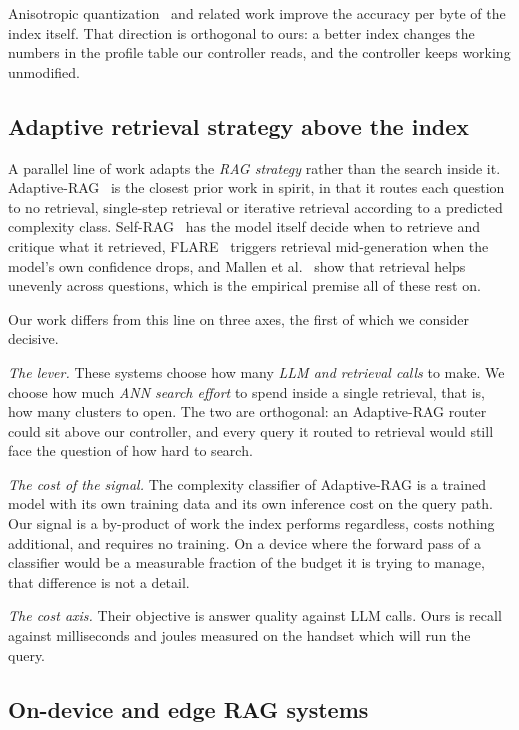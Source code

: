 \documentclass[journal]{IEEEtran}
\begin{document}
Anisotropic quantization~\cite{guo2020scann} and related work improve the
accuracy per byte of the index itself. That direction is orthogonal to
ours: a better index changes the numbers in the profile table our
controller reads, and the controller keeps working unmodified.

\subsection{Adaptive retrieval strategy above the index}
\label{sec:rel-adaptive-rag}

A parallel line of work adapts the \emph{RAG strategy} rather than the
search inside it. Adaptive-RAG~\cite{jeong2024adaptiverag} is the closest
prior work in spirit, in that it routes each question to no retrieval,
single-step retrieval or iterative retrieval according to a predicted
complexity class. Self-RAG~\cite{asai2024selfrag} has the model itself
decide when to retrieve and critique what it retrieved,
FLARE~\cite{jiang2023flare} triggers retrieval mid-generation when the
model's own confidence drops, and Mallen et al.~\cite{mallen2023whennot}
show that retrieval helps unevenly across questions, which is the empirical
premise all of these rest on.

Our work differs from this line on three axes, the first of which we
consider decisive.

\emph{The lever.} These systems choose how many \emph{LLM and retrieval
calls} to make. We choose how much \emph{ANN search effort} to spend inside
a single retrieval, that is, how many clusters to open. The two are
orthogonal: an Adaptive-RAG router could sit above our controller, and
every query it routed to retrieval would still face the question of how
hard to search.

\emph{The cost of the signal.} The complexity classifier of Adaptive-RAG is
a trained model with its own training data and its own inference cost on
the query path. Our signal is a by-product of work the index performs
regardless, costs nothing additional, and requires no training. On a device
where the forward pass of a classifier would be a measurable fraction of
the budget it is trying to manage, that difference is not a detail.

\emph{The cost axis.} Their objective is answer quality against LLM calls.
Ours is recall against milliseconds and joules measured on the handset
which will run the query.

\subsection{On-device and edge RAG systems}
\end{document}
